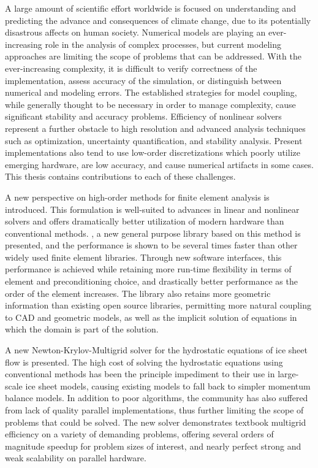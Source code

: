 A large amount of scientific effort worldwide is focused on understanding and predicting the advance and consequences of climate change, due to its potentially disastrous affects on human society.
Numerical models are playing an ever-increasing role in the analysis of complex processes, but current modeling approaches are limiting the scope of problems that can be addressed.
With the ever-increasing complexity, it is difficult to verify correctness of the implementation, assess accuracy of the simulation, or distinguish between numerical and modeling errors.
The established strategies for model coupling, while generally thought to be necessary in order to manage complexity, cause significant stability and accuracy problems.
Efficiency of nonlinear solvers represent a further obstacle to high resolution and advanced analysis techniques such as optimization, uncertainty quantification, and stability analysis.
Present implementations also tend to use low-order discretizations which poorly utilize emerging hardware, are low accuracy, and cause numerical artifacts in some cases.
This thesis contains contributions to each of these challenges.

A new perspective on high-order methods for finite element analysis is introduced.
This formulation is well-suited to advances in linear and nonlinear solvers and offers dramatically better utilization of modern hardware than conventional methods.
\Dohp, a new general purpose library based on this method is presented, and the performance is shown to be several times faster than other widely used finite element libraries.
Through new software interfaces, this performance is achieved while retaining more run-time flexibility in terms of element and preconditioning choice, and drastically better performance as the order of the element increases.
The library also retains more geometric information than existing open source libraries, permitting more natural coupling to CAD and geometric models, as well as the implicit solution of equations in which the domain is part of the solution.

A new Newton-Krylov-Multigrid solver for the hydrostatic equations of ice sheet flow is presented.
The high cost of solving the hydrostatic equations using conventional methods has been the principle impediment to their use in large-scale ice sheet models, causing existing models to fall back to simpler momentum balance models.
In addition to poor algorithms, the community has also suffered from lack of quality parallel implementations, thus further limiting the scope of problems that could be solved.
The new solver demonstrates textbook multigrid efficiency on a variety of demanding problems, offering several orders of magnitude speedup for problem sizes of interest, and nearly perfect strong and weak scalability on parallel hardware.

